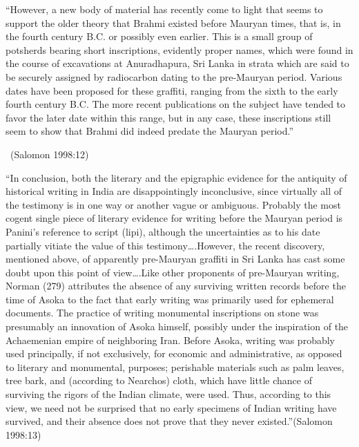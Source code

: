\begin{myquote}
“However, a new body of material has recently come to light that seems to support the older theory that Brahmi existed before Mauryan times, that is, in the fourth century B.C. or possibly even earlier. This is a small group of potsherds bearing short inscriptions, evidently proper names, which were found in the course of excavations at Anuradhapura, Sri Lanka in strata which are said to be securely assigned by radiocarbon dating to the pre-Mauryan period. Various dates have been proposed for these graffiti, ranging from the sixth to the early fourth century B.C. The more recent publications on the subject have tended to favor the later date within this range, but in any case, these inscriptions still seem to show that Brahmi did indeed predate the Mauryan period.”

~\hfill (Salomon 1998:12)
\end{myquote}

\begin{myquote}
“In conclusion, both the literary and the epigraphic evidence for the antiquity of historical writing in India are disappointingly inconclusive, since virtually all of the testimony is in one way or another vague or ambiguous. Probably the most cogent single piece of literary evidence for writing before the Mauryan period is Panini’s reference to script (lipi), although the uncertainties as to his date partially vitiate the value of this testimony….However, the recent discovery, mentioned above, of apparently pre-Mauryan graffiti in Sri Lanka has cast some doubt upon this point of view….Like other proponents of pre-Mauryan writing, Norman (279) attributes the absence of any surviving written records before the time of Asoka to the fact that early writing was primarily used for ephemeral documents. The practice of writing monumental inscriptions on stone was presumably an innovation of Asoka himself, possibly under the inspiration of the Achaemenian empire of neighboring Iran. Before Asoka, writing was probably used principally, if not exclusively, for economic and administrative, as opposed to literary and monumental, purposes; perishable materials such as palm leaves, tree bark, and (according to Nearchos) cloth, which have little chance of surviving the rigors of the Indian climate, were used. Thus, according to this view, we need not be surprised that no early specimens of Indian writing have survived, and their absence does not prove that they never existed.”\hfill (Salomon 1998:13)
\end{myquote}

